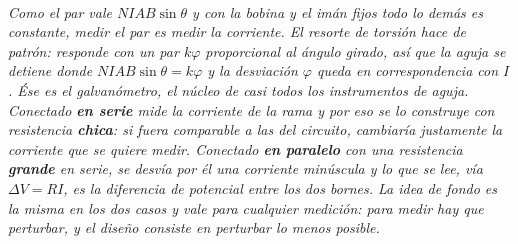 \begin{center}
\\[0.5em]
{\small\itshape Como el par vale $NIAB\sin\theta$ y con la bobina y el imán
fijos todo lo demás es constante, medir el par es medir la corriente. El resorte
de torsión hace de patrón: responde con un par $k\varphi$ proporcional al ángulo
girado, así que la aguja se detiene donde $NIAB\sin\theta = k\varphi$ y la
desviación $\varphi$ queda en correspondencia con $I$. Ése es el galvanómetro,
el núcleo de casi todos los instrumentos de aguja. Conectado \textbf{en serie}
mide la corriente de la rama y por eso se lo construye con resistencia
\textbf{chica}: si fuera comparable a las del circuito, cambiaría justamente la
corriente que se quiere medir. Conectado \textbf{en paralelo} con una
resistencia \textbf{grande} en serie, se desvía por él una corriente minúscula y
lo que se lee, vía $\Delta V = RI$, es la diferencia de potencial entre los dos
bornes. La idea de fondo es la misma en los dos casos y vale para cualquier
medición: para medir hay que perturbar, y el diseño consiste en perturbar lo
menos posible.}
\end{center}

